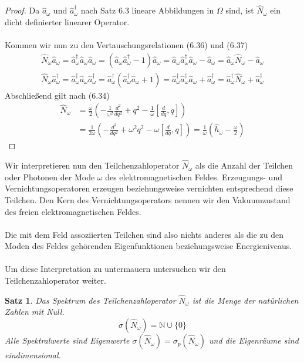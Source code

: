 \documentclass[11pt,a4paper,leqno]{report}
\newtheorem{proposition}{Satz}[chapter]
\numberwithin{equation}{chapter}
\begin{document}
\begin{proof}
	Da $\hat{a}_\omega$ und $\hat{a}^\dagger_\omega$ nach Satz 6.3 lineare Abbildungen in $\Omega$ sind, ist $\hat{N}_\omega$ ein dicht definierter linearer Operator.\\
	\\
	Kommen wir nun zu den Vertauschungsrelationen (6.36) und (6.37)
	\begin{align*}
		\hat{N}_\omega\hat{a}_\omega = \hat{a}^\dagger_\omega\hat{a}_\omega\hat{a}_\omega = (\hat{a}_\omega\hat{a}^\dagger_\omega - 1 )\hat{a}_\omega=\hat{a}_\omega\hat{a}^\dagger_\omega\hat{a}_\omega - \hat{a}_\omega = \hat{a}_\omega\hat{N}_\omega - \hat{a}_\omega
	\end{align*}
	\begin{align*}
	\hat{N}_\omega\hat{a}_\omega^\dagger = \hat{a}^\dagger_\omega\hat{a}_\omega\hat{a}_\omega^\dagger = \hat{a}^\dagger_\omega(\hat{a}_\omega^\dagger\hat{a}_\omega+1)=\hat{a}^\dagger_\omega\hat{a}_\omega^\dagger\hat{a}_\omega+\hat{a}^\dagger_\omega=\hat{a}^\dagger_\omega\hat{N}_\omega+\hat{a}^\dagger_\omega
\end{align*}
Abschlie\ss{}end gilt nach (6.34)
\begin{align*}
	\hat{N}_\omega &=
	\frac{\omega}{2}(-\frac{1}{\omega^2}\frac{d^2}{dq^2}+q^2 - \frac{1}{\omega}[\frac{d}{dq},q])\\&=\frac{1}{2\omega}(-\frac{d^2}{dq^2}+\omega^2q^2 - \omega [\frac{d}{dq},q])= \frac{1}{\omega}(\hat{h}_\omega - \frac{\omega}{2} )
\end{align*}
\end{proof}
\noindent
Wir interpretieren nun den Teilchenzahloperator $\hat{N}_\omega$ als die Anzahl der Teilchen oder Photonen der Mode $\omega$ des elektromagnetischen Feldes. Erzeugungs- und Vernichtungsoperatoren erzeugen beziehungsweise vernichten entsprechend diese Teilchen.
Den Kern des Vernichtungsoperators nennen wir den Vakuumzustand des freien elektromagnetischen Feldes.\\
\\
Die mit dem Feld assoziierten Teilchen sind also nichts anderes als die zu den Moden des Feldes geh\"orenden Eigenfunktionen beziehungsweise Energieniveaus.\\
\\
Um diese Interpretation zu untermauern untersuchen wir den Teilchenzahloperator weiter.
\begin{proposition}
	Das Spektrum des Teilchenzahloperator $\hat{N}_\omega$ ist die Menge der nat\"urlichen Zahlen mit Null. 
	\begin{equation}
		\sigma(\hat{N}_\omega)=\mathbb{N}\cup\{0\}
	\end{equation}
Alle Spektralwerte sind Eigenwerte $\sigma(\hat{N}_\omega)=\sigma_p(\hat{N}_\omega)$ und die Eigenr\"aume sind eindimensional.
\end{proposition}
\end{document}
